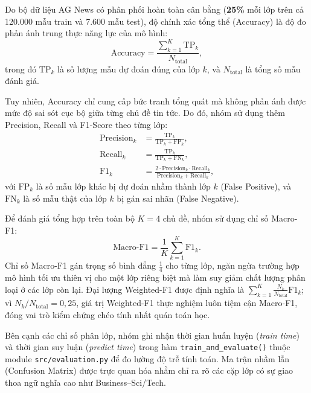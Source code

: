 \documentclass[12pt]{hcmut-report}
\newcommand{\firstparagraph}{\noindent\hspace*{2em}}
\begin{document}
\firstparagraph Do bộ dữ liệu AG News có phân phối hoàn toàn cân bằng (\textbf{25\%} mỗi lớp trên cả 120.000 mẫu train và 7.600 mẫu test), độ chính xác tổng thể (Accuracy) là độ đo phản ánh trung thực năng lực của mô hình:
\begin{equation}
  \mathrm{Accuracy} = \frac{\sum_{k=1}^K \mathrm{TP}_k}{N_{\text{total}}},
  \label{eq:accuracy}
\end{equation}
trong đó $\mathrm{TP}_k$ là số lượng mẫu dự đoán đúng của lớp $k$, và $N_{\text{total}}$ là tổng số mẫu đánh giá.

Tuy nhiên, Accuracy chỉ cung cấp bức tranh tổng quát mà không phản ánh được mức độ sai sót cục bộ giữa từng chủ đề tin tức. Do đó, nhóm sử dụng thêm Precision, Recall và F1-Score theo từng lớp:
\begin{align}
  \mathrm{Precision}_k &= \frac{\mathrm{TP}_k}{\mathrm{TP}_k + \mathrm{FP}_k}, \label{eq:precision}\\
  \mathrm{Recall}_k &= \frac{\mathrm{TP}_k}{\mathrm{TP}_k + \mathrm{FN}_k}, \label{eq:recall}\\
  \mathrm{F1}_k &= \frac{2 \cdot \mathrm{Precision}_k \cdot \mathrm{Recall}_k}{\mathrm{Precision}_k + \mathrm{Recall}_k}, \label{eq:f1-score}
\end{align}
với $\mathrm{FP}_k$ là số mẫu lớp khác bị dự đoán nhầm thành lớp $k$ (False Positive), và $\mathrm{FN}_k$ là số mẫu thật của lớp $k$ bị gán sai nhãn (False Negative).

Để đánh giá tổng hợp trên toàn bộ $K=4$ chủ đề, nhóm sử dụng chỉ số Macro-F1:
\begin{equation}
  \mathrm{Macro\mbox{-}F1} = \frac{1}{K} \sum_{k=1}^K \mathrm{F1}_k.
  \label{eq:macro-f1}
\end{equation}
Chỉ số Macro-F1 gán trọng số bình đẳng $\frac{1}{4}$ cho từng lớp, ngăn ngừa trường hợp mô hình tối ưu thiên vị cho một lớp riêng biệt mà làm suy giảm chất lượng phân loại ở các lớp còn lại. Đại lượng Weighted-F1 được định nghĩa là $\sum_{k=1}^K \frac{N_k}{N_{\text{total}}} \mathrm{F1}_k$; vì $N_k / N_{\text{total}} = 0{,}25$, giá trị Weighted-F1 thực nghiệm luôn tiệm cận Macro-F1, đóng vai trò kiểm chứng chéo tính nhất quán toán học.

Bên cạnh các chỉ số phân lớp, nhóm ghi nhận thời gian huấn luyện (\textit{train time}) và thời gian suy luận (\textit{predict time}) trong hàm \texttt{train\_and\_evaluate()} thuộc module \texttt{src/\allowbreak evaluation.py} để đo lường độ trễ tính toán. Ma trận nhầm lẫn (Confusion Matrix) được trực quan hóa nhằm chỉ ra rõ các cặp lớp có sự giao thoa ngữ nghĩa cao như Business--Sci/Tech.
\end{document}
